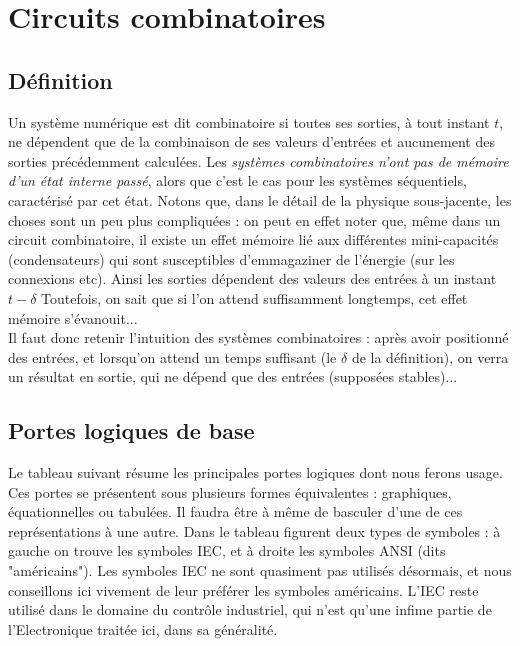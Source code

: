 \chapter{Circuits combinatoires}
\minitoc
\section{Définition}
Un système numérique est dit combinatoire si toutes ses sorties, à tout instant $t$, ne dépendent que de la combinaison de
ses valeurs d'entrées et aucunement des sorties précédemment calculées. Les {\it systèmes combinatoires n'ont pas de mémoire d'un état interne passé}, alors que c'est le cas pour les systèmes séquentiels, caractérisé par cet état.
Notons que, dans le détail de la physique sous-jacente, les choses sont un peu plus compliquées :
on peut en effet noter que, même dans un circuit combinatoire, il existe un effet mémoire lié aux différentes mini-capacités
(condensateurs) qui sont susceptibles d'emmagaziner de l'énergie (sur les connexions etc). Ainsi les sorties dépendent des valeurs des entrées à un instant $t-\delta$
Toutefois, on sait que si l'on attend suffisamment longtemps, cet effet mémoire s'évanouit...\\

Il faut donc retenir l'intuition des systèmes combinatoires :
après avoir positionné des entrées, et lorsqu'on attend un temps suffisant (le $\delta$ de la définition),
on verra un résultat en sortie, qui ne dépend que des entrées (supposées stables)...

\section{Portes logiques de base}

Le tableau suivant résume les principales portes logiques dont nous ferons usage. Ces portes se présentent sous plusieurs formes équivalentes :
graphiques, équationnelles ou tabulées. Il faudra être à même de basculer d'une de ces représentations à une autre. Dans le tableau figurent deux types de
symboles : à gauche on trouve les symboles IEC, et à droite les symboles ANSI (dits "américains"). Les symboles IEC ne sont quasiment pas utilisés désormais, et
nous conseillons ici vivement de leur préférer les symboles américains. L'IEC reste utilisé dans le domaine du contrôle industriel, qui n'est qu'une infime partie de
l'Electronique traitée ici, dans sa généralité.

